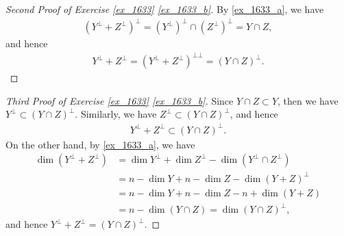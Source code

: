 \documentclass[11pt]{book}
\theoremstyle{definition}
\numberwithin{equation}{chapter}
\begin{document}
\begin{proof}[Second Proof of Exercise \ref{ex_1633} \ref{ex_1633_b}]
By \ref{ex_1633_a}, we have
\begin{align*}
    \left(Y^\bot + Z^\bot\right)^\bot = \left(Y^\bot\right)^\bot \cap \left(Z^\bot\right)^\bot = Y \cap Z,
\end{align*}
and hence
\begin{align*}
    Y^\bot + Z^\bot = \left(Y^\bot + Z^\bot\right)^{\bot\bot} = \left(Y \cap Z\right)^\bot.
\end{align*}
\end{proof}

\begin{proof}[Third Proof of Exercise \ref{ex_1633} \ref{ex_1633_b}]
Since $Y \cap Z \subset Y$, then we have $Y^\bot \subset \left(Y \cap Z\right)^\bot$. Similarly, we have $Z^\bot \subset \left(Y \cap Z\right)^\bot$, and hence
\begin{align*}
    Y^\bot + Z^\bot \subset \left(Y \cap Z\right)^\bot.
\end{align*}
On the other hand, by \ref{ex_1633_a}, we have
\begin{align*}
    \dim  \left(Y^\bot + Z^\bot\right) & = \dim  Y^\bot + \dim  Z^\bot - \dim  \left(Y^\bot \cap Z^\bot\right) \\
    & = n - \dim  Y + n - \dim  Z - \dim  (Y + Z)^\bot \\
    & = n - \dim  Y + n - \dim  Z - n + \dim  (Y + Z) \\
    & = n - \dim  (Y \cap Z) = \dim  (Y \cap Z)^\bot,
\end{align*}
and hence $Y^\bot + Z^\bot = (Y \cap Z)^\bot$.
\end{proof}

\medskip
\end{document}
